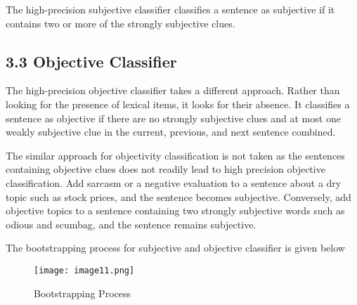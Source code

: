 \documentclass[12pt]{article}
\begin{document}
The high-precision subjective classifier classifies a sentence as subjective if it contains two or more of the strongly subjective clues.\par

\subsection*{3.3 Objective Classifier}
The high-precision objective classifier takes a different approach. Rather than looking for the presence of lexical items, it looks for their absence. It classifies a sentence as objective if there are no strongly subjective clues and at most one weakly subjective clue in the current, previous, and next sentence combined.\par

The similar approach for objectivity classification is not taken as the sentences containing objective clues does not readily lead to high precision objective classification. Add sarcasm or a negative evaluation to a sentence about a dry topic such as stock prices, and the sentence becomes subjective. Conversely, add objective topics to a sentence containing two strongly subjective words such as odious and scumbag, and the sentence remains subjective.\par


\vspace{\baselineskip}
The bootstrapping process for subjective and objective classifier is given below\par


\vspace{\baselineskip}
\begin{Center}



\begin{figure}[H]
	\begin{Center}
		\texttt{[image: image11.png]}
		\caption{Bootstrapping Process}
		\label{fig:Bootstrapping Process}
	\end{Center}
\end{figure}



\\
\textbf{}
\end{Center}\par
\end{document}
